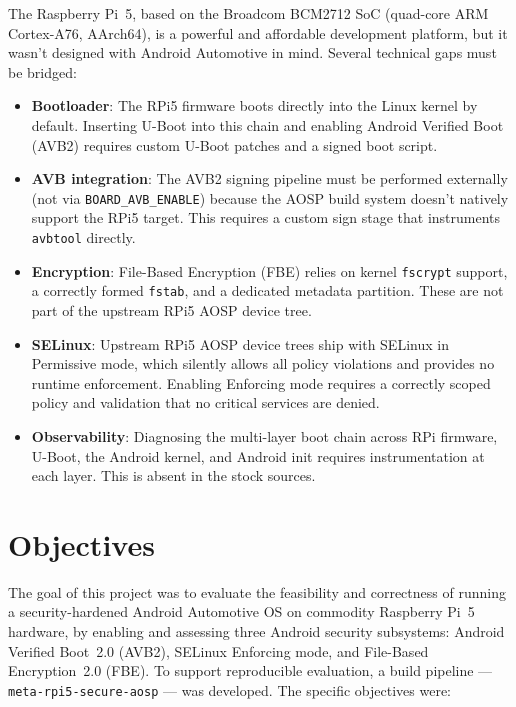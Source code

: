 The Raspberry Pi~5, based on the Broadcom BCM2712 SoC (quad-core ARM Cortex-A76, AArch64), is a powerful and affordable development platform, but it wasn't designed with Android Automotive in mind. Several technical gaps must be bridged:

\begin{itemize}
    \item \textbf{Bootloader}: The RPi5 firmware boots directly into the Linux kernel by default. Inserting U-Boot into this chain and enabling Android Verified Boot (AVB2) requires custom U-Boot patches and a signed boot script.
    \item \textbf{AVB integration}: The AVB2 signing pipeline must be performed externally (not via \texttt{BOARD\_AVB\_ENABLE}) because the AOSP build system doesn't natively support the RPi5 target. This requires a custom sign stage that instruments \texttt{avbtool} directly.
    \item \textbf{Encryption}: File-Based Encryption (FBE) relies on kernel \texttt{fscrypt} support, a correctly formed \texttt{fstab}, and a dedicated metadata partition. These are not part of the upstream RPi5 AOSP device tree.
    \item \textbf{SELinux}: Upstream RPi5 AOSP device trees ship with SELinux in Permissive mode, which silently allows all policy violations and provides no runtime enforcement. Enabling Enforcing mode requires a correctly scoped policy and validation that no critical services are denied.
    \item \textbf{Observability}: Diagnosing the multi-layer boot chain across RPi firmware, U-Boot, the Android kernel, and Android init requires instrumentation at each layer. This is absent in the stock sources.
\end{itemize}

\section{Objectives}

The goal of this project was to evaluate the feasibility and correctness of running a security-hardened Android Automotive OS on commodity Raspberry Pi~5 hardware, by enabling and assessing three Android security subsystems: Android Verified Boot~2.0 (AVB2), SELinux Enforcing mode, and File-Based Encryption~2.0 (FBE). To support reproducible evaluation, a build pipeline --- \texttt{meta-rpi5-secure-aosp} --- was developed. The specific objectives were:

